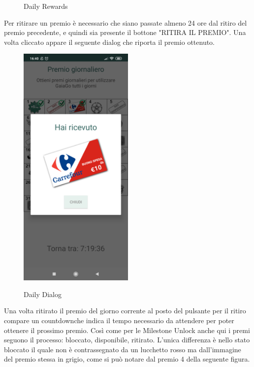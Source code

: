 \begin{itemize}
\begin{figure}[H]
	 	\caption{Daily Rewards}
	 	\label{daily}
	 \end{figure}
	 \pagebreak
	 Per ritirare un premio è necessario che siano passate almeno 24 ore dal ritiro del premio precedente, e quindi sia presente il bottone "RITIRA IL PREMIO". Una volta cliccato appare il seguente dialog che riporta il premio ottenuto.
	  \begin{figure}[H] 
	 	\centering 
	 	\includegraphics[width=0.5\textwidth]{res/images/daily2.png}\\
	 	\caption{Daily Dialog}
	 	\label{daily2}
	 \end{figure}
	 \pagebreak
	 Una volta ritirato il premio del giorno corrente al posto del pulsante per il ritiro compare un countdown\glosp che indica il tempo necessario da attendere per poter ottenere il prossimo premio. Così come per le Milestone Unlock anche qui i premi seguono il processo: bloccato, disponibile, ritirato. L'unica differenza è nello stato bloccato il quale non è contrassegnato da un lucchetto rosso ma dall'immagine del premio stessa in grigio, come si può notare dal premio 4 della seguente figura. 
	 \begin{figure}[H] 
	 	\centering 

\end{figure}
\end{itemize}
